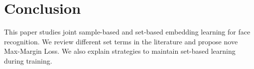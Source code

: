 \documentclass[10pt,twocolumn,letterpaper]{article}
\newcommand{\margin}{Max-Margin Loss\xspace}
\begin{document}
%

\section{Conclusion}

This paper studies joint sample-based and set-based embedding learning for face recognition. We review different set terms in the literature and propose nove \margin. We also explain strategies to maintain set-based learning during training.
\end{document}
